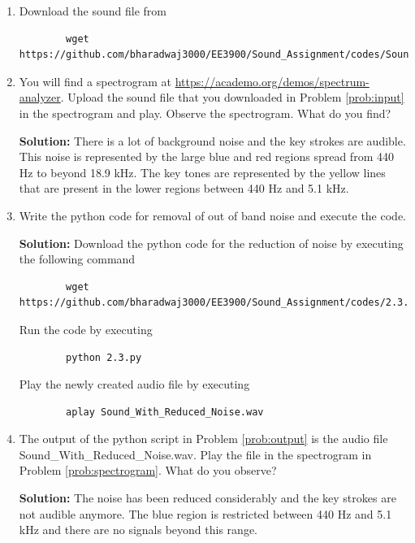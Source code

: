 \documentclass[journal,12pt,twocolumn]{IEEEtran}
\newcommand{\solution}{\noindent \textbf{Solution: }}
\numberwithin{equation}{section}
\renewcommand\thesection{\arabic{section}}
\begin{document}
	\begin{enumerate}[label=\thesection.\arabic*,ref=\thesection.\theenumi]
	\item \label{prob:input} Download the sound file from  
	\begin{lstlisting}
		wget https://github.com/bharadwaj3000/EE3900/Sound_Assignment/codes/Sound_Noise.wav
	\end{lstlisting}
	
	\item \label{prob:spectrogram} You will find a spectrogram at \href{https://academo.org/demos/spectrum-analyzer}{\url{https://academo.org/demos/spectrum-analyzer}}. Upload the sound file that you downloaded in Problem \ref{prob:input} in the spectrogram  and play.  Observe the spectrogram. What do you find?
	
	\solution There is a lot of background noise and the key strokes are audible. This noise is represented by the large blue and red regions spread from 440 Hz to beyond 18.9 kHz. The key tones are represented by the yellow lines that are present in the lower regions between 440 Hz and 5.1 kHz.
	
	\item \label{prob:output} Write the python code for removal of out of band noise and execute the code. 
	
	\solution Download the python code for the reduction of noise by executing the following command
	\begin{lstlisting}
		wget https://github.com/bharadwaj3000/EE3900/Sound_Assignment/codes/2.3.py
	\end{lstlisting}
	
	Run the code by executing
	\begin{lstlisting}
		python 2.3.py
	\end{lstlisting}
	
	Play the newly created audio file by executing
	\begin{lstlisting}
		aplay Sound_With_Reduced_Noise.wav
	\end{lstlisting}
	
	\item The output of the python script in Problem \ref{prob:output} is the audio file Sound\_With\_Reduced\_Noise.wav. Play the file in the spectrogram in Problem \ref{prob:spectrogram}. What do you observe?
	
	\solution The noise has been reduced considerably and the key strokes are not audible anymore. The blue region is restricted between 440 Hz and 5.1 kHz and there are no signals beyond this range.
	
	
	\end{enumerate}
	
\end{document}
